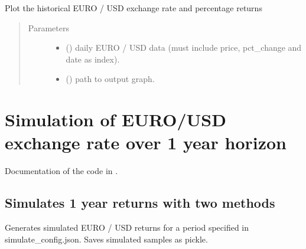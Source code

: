 \documentclass[a4paper,11pt,english]{sphinxmanual}
\begin{document}
\begin{fulllineitems}
\label{\detokenize{download_data:src.download_data.task_descriptive_analysis.plot_historical_timeseries}}
\sphinxAtStartPar
Plot the historical EURO / USD exchange rate and percentage returns
\begin{quote}\begin{description}
\item[{Parameters}] \leavevmode\begin{itemize}
\item {} 
\sphinxAtStartPar
{} () \textendash{} daily EURO / USD data (must include price,
pct\_change and date as index).

\item {} 
\sphinxAtStartPar
{} () \textendash{} path to output graph.

\end{itemize}

\end{description}\end{quote}

\end{fulllineitems}

\label{\detokenize{simulation:simulation}}

\chapter{Simulation of EURO/USD exchange rate over 1 year horizon}
\label{\detokenize{simulation:simulation-of-euro-usd-exchange-rate-over-1-year-horizon}}\label{\detokenize{simulation::doc}}
\sphinxAtStartPar
Documentation of the code in .


\section{Simulates 1 year returns with two methods}
\label{\detokenize{simulation:simulates-1-year-returns-with-two-methods}}\label{\detokenize{simulation:module-src.simulation.task_simulate_sample}}
\sphinxAtStartPar
Generates simulated EURO / USD returns for a period
specified in simulate\_config.json.
Saves simulated samples as pickle.
\end{document}
